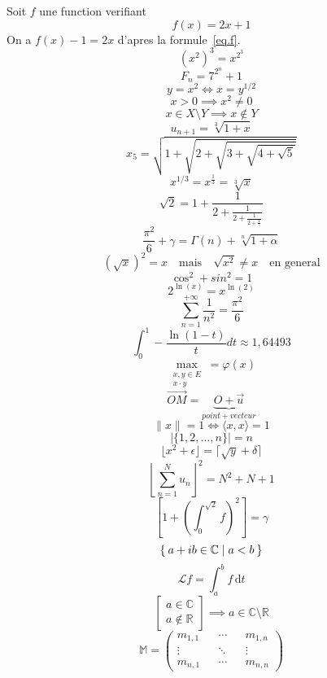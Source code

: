 \documentclass{scrartcl}
\theoremstyle{plain}
\theoremstyle{definition}
\theoremstyle{remark}
\begin{document}
Soit $f$ une function verifiant
\begin{equation}\label{eq.f}
f(x) = 2x+1
\end{equation}
On a $f(x) - 1 = 2x$ d'apres la formule~\eqref{eq.f}.
\begin{equation}
  {(x^{2})}^{3} = x^{2^{3}}
\end{equation}
\begin{equation}
  F_{n}=7^{2^{n}}+ 1
\end{equation}
\[
  y = x^{2} \iff x = y ^{1/2}
\]
\[
  x > 0 \implies x^{2} \neq 0
\]
\[
  x \in X \setminus Y \implies x \not \in Y
\]
\[
  u_{n+1}=\sqrt[3]{1+x}
\]
\[
  x_{5} = \sqrt{1+\sqrt{2+\sqrt{3+\sqrt{4+\sqrt{5}}}}}
\]
\[
  x^{1/3} = x^{\frac{1}{3}} = \sqrt[3]{x}
\]
\[
  \sqrt{2} = 1 + \frac{1}{2+\frac{1}{2+\frac{1}{2+\frac{1}{\ddots}}}}
\]
\[
  \frac{\pi^{2}}{6} + \gamma = \Gamma(n) + \sqrt[n]{1+\alpha}
\]
\[
  (\sqrt{x})^{2} = x \quad \text{mais}\quad \sqrt{x^{2}} \neq x \quad\text{en general}
\]
\[
  \cos^{2}+sin^{2} = 1
\]
\[
  2^{\ln(x)} = x^{\ln(2)}
\]
\[
  \sum_{n=1}^{+\infty}\frac{1}{n^{2}} = \frac{\pi^{2}}{6}
\]
\[
  \int_{0}^{1}-\frac{\ln(1-t)}{t}dt\approx1,64493
\]
\[
  \max_{\substack{x, y \in E\\x \cdot y}} = \varphi(x)
\]
\[
  \overrightarrow{OM} = \underbrace{O + \overrightarrow{u}}_{point+vecteur}
\]
\[
  \lVert x \rVert = 1 \iff \langle x,x \rangle = 1
\]
\[
  \lvert \{ 1,2,\dots,n\} \rvert = n
\]
\[
  \lfloor x^{2}+\epsilon \rfloor = \lceil \sqrt{y} + \delta \rceil
\]
\[
  \left\lfloor\sum_{n=1}^{N}u_{n} \right\rfloor ^{2} = N^{2}+N+1
\]
\[
  \left[ 1+ \left(\int_{0}^{\sqrt{2}}f \right)^{2}\right] = \gamma
\]
\[
\Set{a+ib \in \mathbb{C} | a < b}
\]
\[
  \mathcal{L}f = \int_{a}^{b}f \, \mathrm{d}t
\]
\[
  \left[
  \begin{array}{r}
    a \in \mathbb{C} \\
   a \not \in \mathbb{R}
  \end{array}
  \right]
  \implies
  a \in \mathbb{C} \setminus \mathbb{R}
\]
\[
  \mathbb{M} =
  \begin{pmatrix}
    m_{1,1}&& \cdots && m_{1,n} \\
    \vdots && \ddots && \vdots \\
    m_{n,1} && \cdots && m_{n,n}
  \end{pmatrix}
\]
\end{document}
